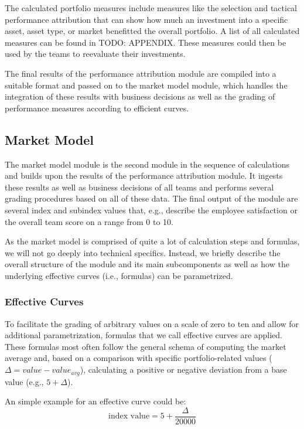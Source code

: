 The calculated portfolio measures include measures like the selection and tactical performance attribution that can show how much an investment into a specific asset, asset type, or market benefitted the overall portfolio. A list of all calculated measures can be found in TODO: APPENDIX. These measures could then be used by the teams to reevaluate their investments.

The final results of the performance attribution module are compiled into a suitable format and passed on to the market model module, which handles the integration of these results with business decisions as well as the grading of performance measures according to efficient curves.


\subsection{Market Model}
The market model module is the second module in the sequence of calculations and builds upon the results of the performance attribution module. It ingests these results as well as business decisions of all teams and performs several grading procedures based on all of these data. The final output of the module are several index and subindex values that, e.g., describe the employee satisfaction or the overall team score on a range from 0 to 10.

As the market model is comprised of quite a lot of calculation steps and formulas, we will not go deeply into technical specifics. Instead, we briefly describe the overall structure of the module and its main subcomponents as well as how the underlying effective curves (i.e., formulas) can be parametrized.

\subsubsection{Effective Curves}
To facilitate the grading of arbitrary values on a scale of zero to ten and allow for additional parametrization, formulas that we call effective curves are applied. These formulas most often follow the general schema of computing the market average and, based on a comparison with specific portfolio-related values (\(\Delta = value - value_{avg}\)), calculating a positive or negative deviation from a base value (e.g., \(5 + \Delta \)).

An simple example for an effective curve could be:
\[\text{index value} = 5 + \frac{\Delta}{20000}\]

